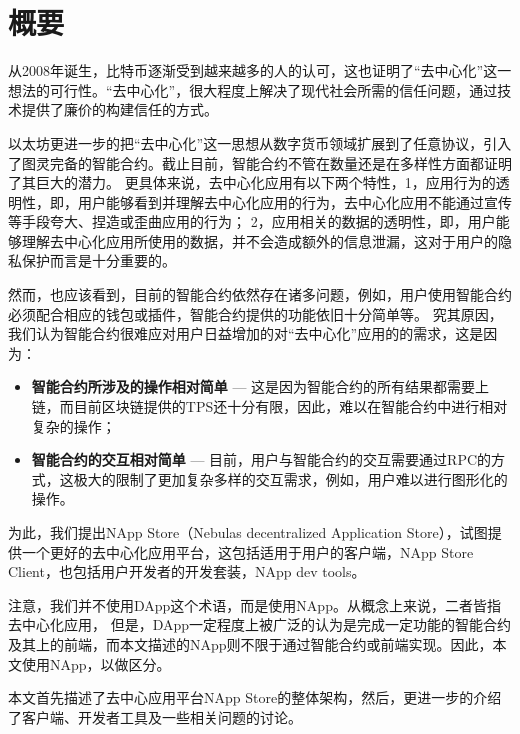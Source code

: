 \section{概要}
从2008年诞生，比特币逐渐受到越来越多的人的认可，这也证明了``去中心化''这一想法的可行性。``去中心化''，很大程度上解决了现代社会所需的信任问题，通过技术提供了廉价的构建信任的方式。

以太坊更进一步的把``去中心化''这一思想从数字货币领域扩展到了任意协议，引入了图灵完备的智能合约。截止目前，智能合约不管在数量还是在多样性方面都证明了其巨大的潜力。
更具体来说，去中心化应用有以下两个特性，1，应用行为的透明性，即，用户能够看到并理解去中心化应用的行为，去中心化应用不能通过宣传等手段夸大、捏造或歪曲应用的行为；
2，应用相关的数据的透明性，即，用户能够理解去中心化应用所使用的数据，并不会造成额外的信息泄漏，这对于用户的隐私保护而言是十分重要的。

然而，也应该看到，目前的智能合约依然存在诸多问题，例如，用户使用智能合约必须配合相应的钱包或插件，智能合约提供的功能依旧十分简单等。
究其原因，我们认为智能合约很难应对用户日益增加的对``去中心化''应用的的需求，这是因为：
\begin{itemize}
\item \textbf{智能合约所涉及的操作相对简单} --- 这是因为智能合约的所有结果都需要上链，而目前区块链提供的TPS还十分有限，因此，难以在智能合约中进行相对复杂的操作；
\item \textbf{智能合约的交互相对简单} --- 目前，用户与智能合约的交互需要通过RPC的方式，这极大的限制了更加复杂多样的交互需求，例如，用户难以进行图形化的操作。
\end{itemize}

为此，我们提出NApp Store（Nebulas decentralized Application Store），试图提供一个更好的去中心化应用平台，这包括适用于用户的客户端，NApp Store Client，也包括用户开发者的开发套装，NApp dev tools。

注意，我们并不使用DApp这个术语，而是使用NApp。从概念上来说，二者皆指去中心化应用，
但是，DApp一定程度上被广泛的认为是完成一定功能的智能合约及其上的前端，而本文描述的NApp则不限于通过智能合约或前端实现。因此，本文使用NApp，以做区分。

本文首先描述了去中心应用平台NApp Store的整体架构，然后，更进一步的介绍了客户端、开发者工具及一些相关问题的讨论。

